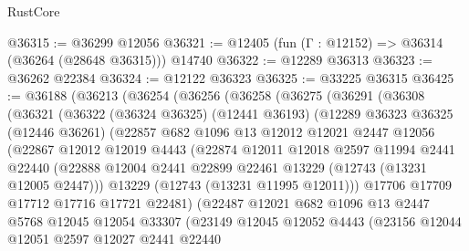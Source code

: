 \begin{lexlean}{RustCore}
\begin{coremodule}
@36315 := @36299 @12056
@36321 := @12405 (fun (Γ : @12152) => @36314 (@36264 (@28648 @36315))) @14740
@36322 := @12289 @36313
@36323 := @36262 @22384
@36324 := @12122 @36323
@36325 := @33225 @36315
@36425 := @36188
    (@36213
      (@36254
        (@36256
          (@36258
            (@36275
              (@36291
                (@36308
                  (@36321
                    (@36322
                      (@36324 @36325)
                      (@12441 @36193)
                      (@12289
                        @36323
                        @36325
                        (@12446 @36261)
                        (@22857
                          @682
                          @1096
                          @13
                          @12012
                          @12021
                          @2447
                          @12056
                          (@22867
                            @12012
                            @12019
                            @4443
                            (@22874
                              @12011
                              @12018
                              @2597
                              @11994
                              @2441
                              @22440
                              (@22888
                                @12004
                                @2441
                                @22899
                                @22461
                                @13229
                                (@12743 (@13231 @12005 @2447)))
                              @13229
                              (@12743 (@13231 @11995 @12011)))
                            @17706
                            @17709
                            @17712
                            @17716
                            @17721
                            @22481)
                          (@22487
                            @12021
                            @682
                            @1096
                            @13
                            @2447
                            @5768
                            @12045
                            @12054
                            @33307
                            (@23149
                              @12045
                              @12052
                              @4443
                              (@23156
                                @12044
                                @12051
                                @2597
                                @12027
                                @2441
                                @22440

\end{coremodule}
\end{lexlean}
